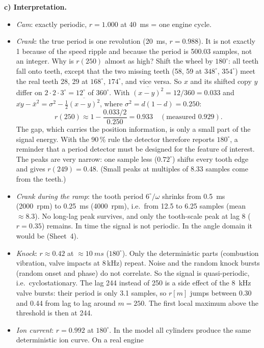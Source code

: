 \begin{solution}
\textbf{c) Interpretation.}
\begin{itemize}
  \item \emph{Cam}: exactly periodic, $r=1.000$ at \SI{40}{ms} = one engine cycle.
  \item \emph{Crank}: the true period is one revolution (\SI{20}{ms}, $r=0.988$).
    It is not exactly 1 because of the speed ripple and because the period is
    500.03 samples, not an integer. Why is $r(250)$ almost as high? Shift the
    wheel by $180^\circ$: all teeth fall onto teeth, except that the two missing teeth
    (58, 59 at $348^\circ$, $354^\circ$) meet the real teeth 28, 29 at
    $168^\circ$, $174^\circ$, and vice versa. So $x$ and its shifted copy $y$ differ on
    $2\cdot2\cdot3^\circ=12^\circ$ of $360^\circ$. With
    $\overline{(x-y)^2}=12/360=0.033$ and
    $\overline{xy}-\bar x^2=\sigma^2-\frac12\overline{(x-y)^2}$, where
    $\sigma^2=d(1-d)=0.250$:
    \[ r(250)\approx1-\frac{0.033/2}{0.250}=0.933 \quad(\text{measured }0.929). \]
    The gap, which carries the position information, is only a small part of
    the signal energy. With the 90\,\% rule the detector therefore reports
    $180^\circ$, a reminder that a period detector must be designed for the
    feature of interest. The peaks are very narrow: one sample less
    ($0.72^\circ$) shifts every tooth edge and gives $r(249)=0.48$. (Small
    peaks at multiples of 8.33 samples come from the teeth.)
  \item \emph{Crank during the ramp}: the tooth period $6^\circ/\omega$
    shrinks from \SI{0.5}{ms} (\SI{2000}{rpm}) to \SI{0.25}{ms}
    (\SI{4000}{rpm}), i.e.\ from 12.5 to 6.25 samples (mean $\approx8.3$). No long-lag peak survives, and only the tooth-scale
    peak at lag 8 ($r=0.35$) remains. In time the signal is not periodic. In
    the angle domain it would be (Sheet~4).
  \item \emph{Knock}: $r\approx0.42$ at $\approx\SI{10}{ms}$ ($180^\circ$).
    Only the deterministic parts (combustion vibration, valve impacts at
    $8$\,kHz) repeat. Noise and the random knock bursts (random onset and
    phase) do not correlate. So the signal is quasi-periodic, i.e.\
    cyclostationary. The lag 244 instead of 250 is a side effect of the
    \SI{8}{kHz} valve bursts: their period is only 3.1 samples, so $r[m]$
    jumps between 0.30 and 0.44 from lag to lag around $m=250$. The first
    local maximum above the threshold is then at 244.
  \item \emph{Ion current}: $r=0.992$ at $180^\circ$. In the model all
    cylinders produce the same deterministic ion curve. On a real engine

\end{itemize}
\end{solution}
